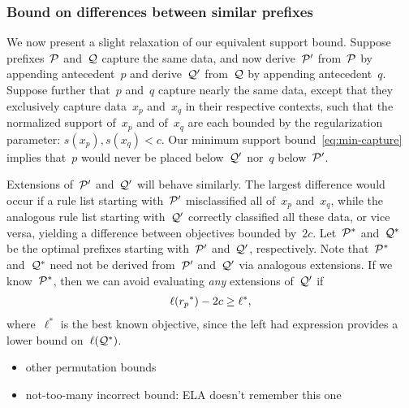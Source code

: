 \subsubsection{Bound on differences between similar prefixes}

We now present a slight relaxation of our equivalent support bound.
%
Suppose prefixes~$\cal P$ and~$\cal Q$ capture the same data,
and now derive~$\cal P'$ from~$\cal P$ by appending antecedent~$p$
and derive~$\cal Q'$ from~$\cal Q$ by appending antecedent~$q$.
%
Suppose further that~$p$ and~$q$ capture nearly the same data, except that
they exclusively capture data~$x_p$ and~$x_q$ in their respective contexts,
such that the normalized support of~$x_p$ and of~$x_q$ are each bounded by
the regularization parameter: ${s(x_p), s(x_q) < c}$.
%
Our minimum support bound~\eqref{eq:min-capture} implies
that~$p$ would never be placed below~$\cal Q'$ nor~$q$ below~$\cal P'$.

Extensions of~$\cal P'$ and~$\cal Q'$ will behave similarly.
%
The largest difference would occur if a rule list starting with~$\cal P'$
misclassified all of~$x_p$ and~$x_q$, while the analogous rule list starting
with~$\cal Q'$ correctly classified all these data, or vice versa,
yielding a difference between objectives bounded by~$2c$.
%
Let~$\cal P^*$ and~$\cal Q^*$ be the optimal prefixes
starting with~$\cal P'$ and~$\cal Q'$, respectively.
%
Note that~$\cal P^*$ and~$\cal Q^*$ need not be derived from~$\cal P'$ and~$\cal Q'$
via analogous extensions.
%
If we know~$\cal P^*$, then we can avoid evaluating \emph{any} extensions of~$\cal Q'$ if
\begin{align}
\ell(\Prefix^*) - 2 c \ge \ell^*,
\end{align}
where~$\ell^*$ is the best known objective, since the left had expression
provides a lower bound on~$\ell(\cal{Q}^*)$.


\begin{itemize}
\item other permutation bounds
\item not-too-many incorrect bound:  ELA doesn't remember this one
\end{itemize}


